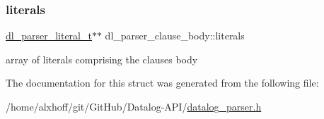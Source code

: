 \subsubsection{\texorpdfstring{literals}{literals}}
{\footnotesize\ttfamily \hyperlink{datalog__parser_8h_adaef2eede58b9f7698925f7194af1373}{dl\+\_\+parser\+\_\+literal\+\_\+t}$\ast$$\ast$ dl\+\_\+parser\+\_\+clause\+\_\+body\+::literals}

array of literals comprising the clause\textquotesingle{}s body 

The documentation for this struct was generated from the following file\+:\begin{DoxyCompactItemize}
\item 
/home/alxhoff/git/\+Git\+Hub/\+Datalog-\/\+A\+P\+I/\hyperlink{datalog__parser_8h}{datalog\+\_\+parser.\+h}\end{DoxyCompactItemize}
